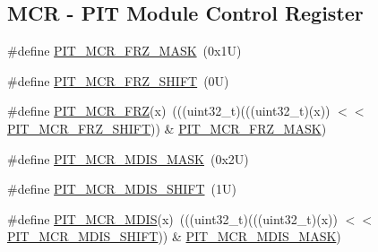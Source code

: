 \subsection*{M\+CR -\/ P\+IT Module Control Register}
\begin{DoxyCompactItemize}
\item 
\#define \mbox{\hyperlink{group___p_i_t___register___masks_ga8149a0bb21843632dd4528b540480ba7}{P\+I\+T\+\_\+\+M\+C\+R\+\_\+\+F\+R\+Z\+\_\+\+M\+A\+SK}}~(0x1\+U)
\item 
\#define \mbox{\hyperlink{group___p_i_t___register___masks_ga500ccd29eaebc20aa853e7bbb23e3c0c}{P\+I\+T\+\_\+\+M\+C\+R\+\_\+\+F\+R\+Z\+\_\+\+S\+H\+I\+FT}}~(0\+U)
\item 
\#define \mbox{\hyperlink{group___p_i_t___register___masks_gab52ff9f5a1c18eee41b58100aa415dfe}{P\+I\+T\+\_\+\+M\+C\+R\+\_\+\+F\+RZ}}(x)~(((uint32\+\_\+t)(((uint32\+\_\+t)(x)) $<$$<$ \mbox{\hyperlink{group___p_i_t___register___masks_ga500ccd29eaebc20aa853e7bbb23e3c0c}{P\+I\+T\+\_\+\+M\+C\+R\+\_\+\+F\+R\+Z\+\_\+\+S\+H\+I\+FT}})) \& \mbox{\hyperlink{group___p_i_t___register___masks_ga8149a0bb21843632dd4528b540480ba7}{P\+I\+T\+\_\+\+M\+C\+R\+\_\+\+F\+R\+Z\+\_\+\+M\+A\+SK}})
\item 
\#define \mbox{\hyperlink{group___p_i_t___register___masks_ga024258b2c23ff75f3e161e56adbbe733}{P\+I\+T\+\_\+\+M\+C\+R\+\_\+\+M\+D\+I\+S\+\_\+\+M\+A\+SK}}~(0x2\+U)
\item 
\#define \mbox{\hyperlink{group___p_i_t___register___masks_ga7ddcd16550ff71e4ee5ac48022ae6fb6}{P\+I\+T\+\_\+\+M\+C\+R\+\_\+\+M\+D\+I\+S\+\_\+\+S\+H\+I\+FT}}~(1\+U)
\item 
\#define \mbox{\hyperlink{group___p_i_t___register___masks_gafae73f01b87a4e133c1289e0d09f8de2}{P\+I\+T\+\_\+\+M\+C\+R\+\_\+\+M\+D\+IS}}(x)~(((uint32\+\_\+t)(((uint32\+\_\+t)(x)) $<$$<$ \mbox{\hyperlink{group___p_i_t___register___masks_ga7ddcd16550ff71e4ee5ac48022ae6fb6}{P\+I\+T\+\_\+\+M\+C\+R\+\_\+\+M\+D\+I\+S\+\_\+\+S\+H\+I\+FT}})) \& \mbox{\hyperlink{group___p_i_t___register___masks_ga024258b2c23ff75f3e161e56adbbe733}{P\+I\+T\+\_\+\+M\+C\+R\+\_\+\+M\+D\+I\+S\+\_\+\+M\+A\+SK}})
\end{DoxyCompactItemize}
